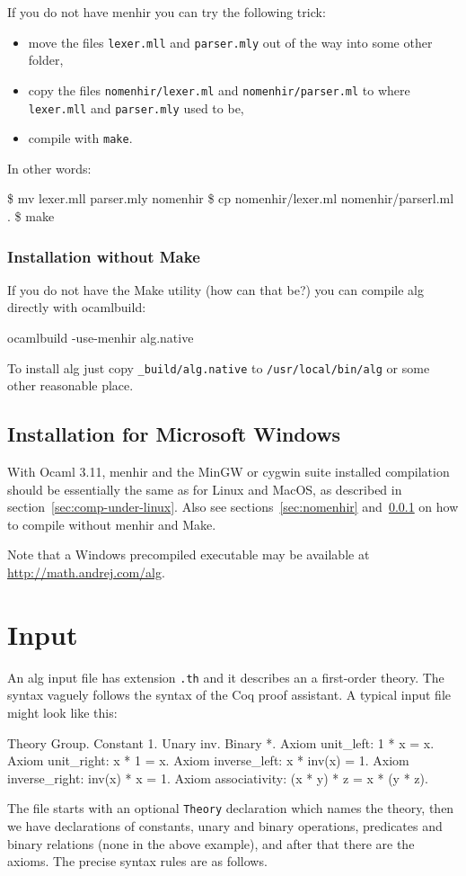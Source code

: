 \documentclass{article}
\begin{document}
If you do not have menhir you can try the following trick:
%
\begin{itemize}
\item move the files \texttt{lexer.mll} and \texttt{parser.mly} out of
  the way into some other folder,
\item copy the files \texttt{nomenhir/lexer.ml} and
  \texttt{nomenhir/parser.ml} to where \texttt{lexer.mll} and
  \texttt{parser.mly} used to be,
\item compile with \texttt{make}.
\end{itemize}
%
In other words:
%
\begin{shell}
\$ mv lexer.mll parser.mly nomenhir
\$ cp nomenhir/lexer.ml nomenhir/parserl.ml .
\$ make
\end{shell}

\subsubsection{Installation without Make}
\label{sec:nomake}

If you do not have the Make utility (how can that be?) you can compile
alg directly with ocamlbuild:
%
\begin{shell}
ocamlbuild -use-menhir alg.native
\end{shell}
%
To install alg just copy \texttt{\_build/alg.native} to
\texttt{/usr/local/bin/alg} or some other reasonable place.

\subsection{Installation for Microsoft Windows}
\label{sec:comp-inst-micr}

With Ocaml 3.11, menhir and the MinGW or cygwin suite installed
compilation should be essentially the same as for Linux and MacOS, as
described in section~\ref{sec:comp-under-linux}. Also see
sections~\ref{sec:nomenhir} and~\ref{sec:nomake} on how to compile
without menhir and Make.

Note that a Windows precompiled executable may be available at
\url{http://math.andrej.com/alg}.

\section{Input}
\label{sec:input}

An alg input file has extension \texttt{.th} and it describes an a
first-order theory. The syntax vaguely follows the syntax of the Coq
proof assistant. A typical input file might look like this:
%
\begin{source}
Theory Group.
Constant 1.
Unary inv.
Binary *.
Axiom unit_left: 1 * x = x.
Axiom unit_right: x * 1 = x.
Axiom inverse_left: x * inv(x) = 1.
Axiom inverse_right: inv(x) * x = 1.
Axiom associativity: (x * y) * z = x * (y * z).
\end{source}
%
The file starts with an optional \texttt{Theory} declaration which
names the theory, then we have declarations of constants, unary and
binary operations, predicates and binary relations (none in the above
example), and after that there are the axioms. The precise syntax
rules are as follows.
\end{document}
